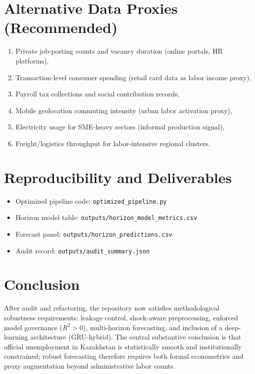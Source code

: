 \documentclass[11pt,a4paper]{article}
\begin{document}
\section{Alternative Data Proxies (Recommended)}
\begin{enumerate}
\item Private job-posting counts and vacancy duration (online portals, HR platforms),
\item Transaction-level consumer spending (retail card data as labor income proxy),
\item Payroll tax collections and social contribution records,
\item Mobile geolocation commuting intensity (urban labor activation proxy),
\item Electricity usage for SME-heavy sectors (informal production signal),
\item Freight/logistics throughput for labor-intensive regional clusters.
\end{enumerate}

\section{Reproducibility and Deliverables}
\begin{itemize}
\item Optimized pipeline code: \texttt{optimized\_pipeline.py}
\item Horizon model table: \texttt{outputs/horizon\_model\_metrics.csv}
\item Forecast panel: \texttt{outputs/horizon\_predictions.csv}
\item Audit record: \texttt{outputs/audit\_summary.json}
\end{itemize}

\section{Conclusion}
After audit and refactoring, the repository now satisfies methodological robustness requirements: leakage control, shock-aware preprocessing, enforced model governance (\(R^2>0\)), multi-horizon forecasting, and inclusion of a deep-learning architecture (GRU-hybrid). The central substantive conclusion is that official unemployment in Kazakhstan is statistically smooth and institutionally constrained; robust forecasting therefore requires both formal econometrics and proxy augmentation beyond administrative labor counts.
\end{document}
